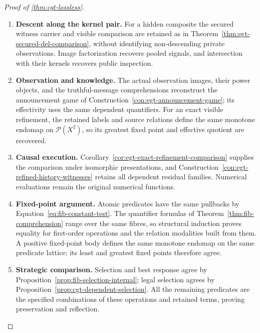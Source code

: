 \documentclass[11pt,a4paper]{article}
\numberwithin{equation}{section}
\theoremstyle{definition}
\theoremstyle{remark}
\theoremstyle{plain}
\begin{document}
\begin{proof}[Proof of \cref{thm:cgt-lossless}]
\begin{enumerate}[label=\textup{(\arabic*)},leftmargin=*,itemsep=4pt,topsep=3pt]
recovered by Theorem~\ref{thm:egt-operational-action-correspondence}.
  \item \textbf{Descent along the kernel pair.} For a hidden composite the secured witness carrier and visible
comparison are retained as in
Theorem~\ref{thm:egt-secured-del-comparison}, without identifying
non-descending private observations. Image factorization recovers pooled
signals, and intersection with their kernels recovers public inspection.
  \item \textbf{Observation and knowledge.} The actual observation images, their power objects, and the truthful-message
comprehensions reconstruct the announcement game of
Construction~\ref{con:egt-announcement-game}; its effectivity uses the
same dependent quantifiers. For an exact visible refinement, the retained
labels and source relations define the same monotone endomap on
$\mathcal P(X^2)$, so its greatest fixed point and effective quotient
are recovered.
  \item \textbf{Causal execution.} Corollary~\ref{cor:egt-exact-refinement-comparison}
supplies the comparison under isomorphic presentations, and
Construction~\ref{con:egt-refined-history-witnesses} retains all
dependent residual families. Numerical evaluations remain the original
numerical functions.
  \item \textbf{Fixed-point argument.} Atomic predicates have the same pullbacks by
Equation~\eqref{eq:fib-constant-test}. The quantifier formulas of
Theorem~\ref{thm:fib-comprehension} range over the same fibres, so
structural induction proves equality for first-order operations and
the relation modalities built from them. A positive fixed-point body
defines the same monotone endomap on the same predicate lattice;
its least and greatest fixed points therefore agree.
  \item \textbf{Strategic comparison.} Selection and
best response agree by Proposition~\ref{prop:fib-selection-internal};
legal selection agrees by Proposition~\ref{prop:cgt-dependent-selection}. All the remaining predicates are the specified combinations of these
operations and retained terms, proving preservation and reflection.
\end{enumerate}
\end{proof}
\end{document}
